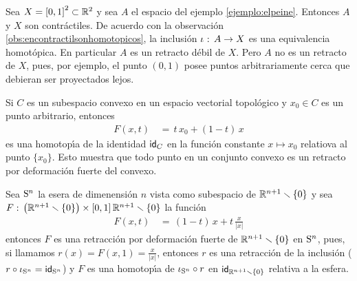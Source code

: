 \begin{ejemploElPeineYElCuadrado}\label{ejemplo:elpeineyelcuadrado}
	Sea $X=\intervalo^{2}\subset\bb{R}^{2}$ y sea $A$ el espacio del
	ejemplo \ref{ejemplo:elpeine}. Entonces $A$ y $X$ son contr\'{a}ctiles.
	De acuerdo con la observaci\'{o}n \ref{obs:encontractilsonhomotopicos},
	la inclusi\'{o}n $\inc:\,A\rightarrow X$ es una equivalencia
	homot\'{o}pica. En particular $A$ es un retracto d\'{e}bil de $X$.
	Pero $A$ no es un retracto de $X$, pues, por ejemplo, el punto
	$(0,1)$ posee puntos arbitrariamente cerca que debieran ser
	proyectados lejos.
\end{ejemploElPeineYElCuadrado}

\begin{ejemploPuntoDeformacionFuerteDeConvexos}%
	\label{ejemplo:puntodeformacionfuertedeconvexos}
	Si $C$ es un subespacio convexo en un espacio vectorial topol\'{o}gico
	y $x_{0}\in C$ es un punto arbitrario, entonces
	\begin{align*}
		F(x,t) & \,=\,t\,x_{0}+(1-t)\,x
	\end{align*}
	es una homotop\'{\i}a de la identidad $\id[C]$ en la funci\'{o}n
	constante $x\mapsto x_{0}$ relatiova al punto $\{x_{0}\}$. Esto
	muestra que todo punto en un conjunto convexo es un retracto por
	deformaci\'{o}n fuerte del convexo.
\end{ejemploPuntoDeformacionFuerteDeConvexos}

\begin{ejemploEsferaDeformacionFuerteDelEspacioSinUnPunto}%
	\label{ejemplo:esferadeformacionfuertedelespaciosinunpunto}
	Sea $\esfera{n}$ la esera de dimenensi\'{o}n $n$ vista como
	subespacio de $\bb{R}^{n+1}\setmin\{0\}$ y sea
	\begin{math}
		F:\,\big(\bb{R}^{n+1}\setmin\{0\}\big)\times\intervalo
			\bb{R}^{n+1}\setmin\{0\}
	\end{math}
	la funci\'{o}n
	\begin{align*}
		F(x,t) & \,=\,(1-t)\,x +t\,\frac{x}{|x|}
	\end{align*}
	entonces $F$ es una retracci\'{o}n por deformaci\'{o}n fuerte de
	$\bb{R}^{n+1}\setmin\{0\}$ en $\esfera{n}$, pues, si llamamos
	$r(x)=F(x,1)=\frac{x}{|x|}$, entonces $r$ es una retracci\'{o}n
	de la inclusi\'{o}n ($r\circ\inc[\esfera{n}]=\id[\esfera{n}]$) y
	$F$ es una homotop\'{\i}a de $\inc[\esfera{n}]\circ r$ en
	$\id[\bb{R}^{n+1}\setmin\{0\}]$ relativa a la esfera.
\end{ejemploEsferaDeformacionFuerteDelEspacioSinUnPunto}


